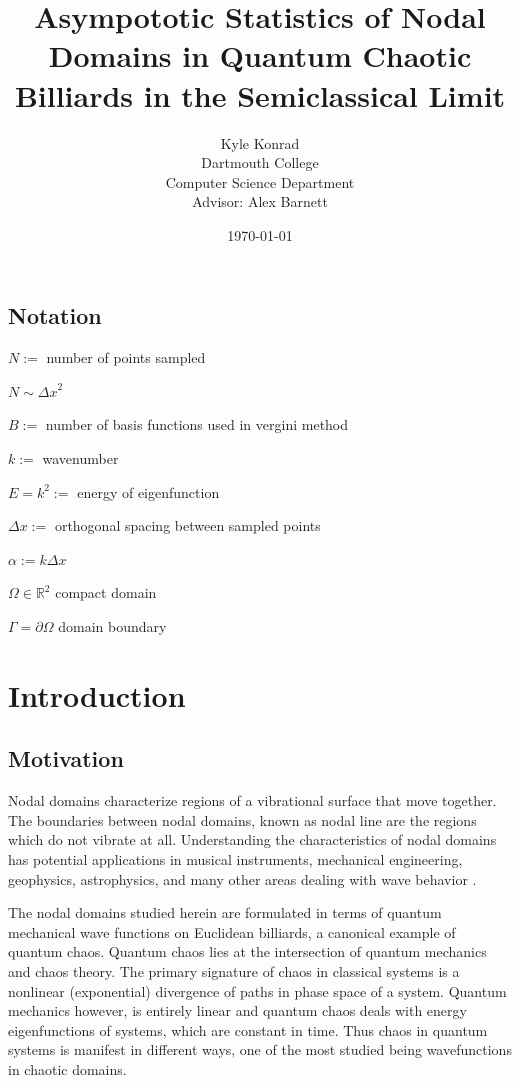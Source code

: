 \documentclass{report}
\begin{document}
\title{Asympototic Statistics of Nodal Domains in Quantum Chaotic Billiards in the Semiclassical Limit}
\author{Kyle Konrad\\
  Dartmouth College\\
  Computer Science Department\\
  Advisor: Alex Barnett}
\date{\today}


\section*{Notation}
$N :=$ number of points sampled

$N \sim {\Delta x}^{2}$

$B :=$ number of basis functions used in vergini method

$k :=$ wavenumber

$E = k^{2} :=$ energy of eigenfunction

$\Delta x :=$ orthogonal spacing between sampled points

$\alpha := k \Delta x$

$\Omega \in \mathbb{R}^2$ compact domain

$\Gamma = \partial \Omega$ domain boundary

\chapter{Introduction}
\label{chap:intro}
\section{Motivation}
\label{sec:motivation}
Nodal domains characterize regions of a vibrational surface that move together. The boundaries between nodal domains, known as nodal line are the regions which do not vibrate at all. Understanding the characteristics of nodal domains has potential applications in musical instruments, mechanical engineering, geophysics, astrophysics, and many other areas dealing with wave behavior \cite{wigman}.

The nodal domains studied herein are formulated in terms of quantum mechanical wave functions on Euclidean billiards, a canonical example of quantum chaos. Quantum chaos lies at the intersection of quantum mechanics and chaos theory. The primary signature of chaos in classical systems is a nonlinear (exponential) divergence of paths in phase space of a system. Quantum mechanics however, is entirely linear and quantum chaos deals with energy eigenfunctions of systems, which are constant in time. Thus chaos in quantum systems is manifest in different ways, one of the most studied being wavefunctions in chaotic domains.
\end{document}
